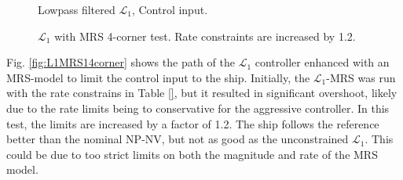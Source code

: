 \begin{figure}[!h]
    \centering
    \caption{Lowpass filtered $\mathcal{L}_1$, Control input. }
\end{figure}\label{fig:L1LPtau}


\begin{figure}[!h]
    \centering
    \caption{ $\mathcal{L}_1$ with MRS 4-corner test. Rate constraints are increased by 1.2. }
\end{figure}\label{fig:L1MRS14corner}

Fig. \ref{fig:L1MRS14corner} shows the path of the $\mathcal{L}_1$ controller enhanced with an MRS-model to limit the control input to the ship. Initially, the $\mathcal{L}_1$-MRS was run with the rate constrains in Table \ref{}, but it resulted in significant overshoot, likely due to the rate limits being to conservative for the aggressive controller. In this test, the limits are increased by a factor of 1.2. The ship follows the reference better than the nominal NP-NV, but not as good as the unconstrained $\mathcal{L}_1$. This could be due to too strict limits on both the magnitude and rate of the MRS model. 

